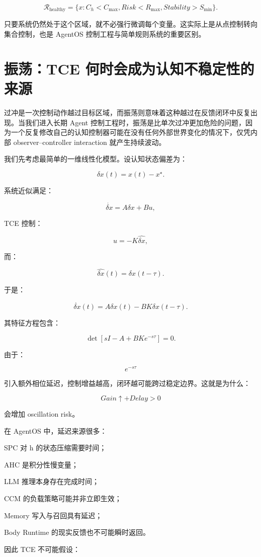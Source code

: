 \[
\boxed{
\mathcal R_{\mathrm{healthy}}
=
\{
x:
C_h<C_{\max},
Risk<R_{\max},
Stability>S_{\min}
\}.
}
\]

只要系统仍然处于这个区域，就不必强行微调每个变量。这实际上是从点控制转向集合控制，也是 AgentOS 控制工程与简单规则系统的重要区别。

\section{振荡：TCE 何时会成为认知不稳定性的来源}

过冲是一次控制动作越过目标区域，而振荡则意味着这种越过在反馈闭环中反复出现。当我们进入长期 Agent 控制工程时，振荡是比单次过冲更加危险的问题，因为一个反复修改自己的认知控制器可能在没有任何外部世界变化的情况下，仅凭内部 observer--controller interaction 就产生持续波动。

我们先考虑最简单的一维线性化模型。设认知状态偏差为：

\[
\delta x(t)=x(t)-x^\star.
\]

系统近似满足：

\[
\dot{\delta x}
=
A\delta x
+
Bu,
\]

TCE 控制：

\[
u=-K\hat{\delta x},
\]

而：

\[
\hat{\delta x}(t)
=
\delta x(t-\tau).
\]

于是：

\[
\dot{\delta x}(t)
=
A\delta x(t)
-
BK\delta x(t-\tau).
\]

其特征方程包含：

\[
\det
\left[
sI-A+BKe^{-s\tau}
\right]
=0.
\]

由于：

\[
e^{-s\tau}
\]

引入额外相位延迟，控制增益越高，闭环越可能跨过稳定边界。这就是为什么：

\[
Gain\uparrow
+
Delay>0
\]

会增加 oscillation risk。

在 AgentOS 中，延迟来源很多：

SPC 对 h 的状态压缩需要时间；

AHC 是积分性慢变量；

LLM 推理本身存在完成时间；

CCM 的负载策略可能并非立即生效；

Memory 写入与召回具有延迟；

Body Runtime 的现实反馈也不可能瞬时返回。

因此 TCE 不可能假设：

